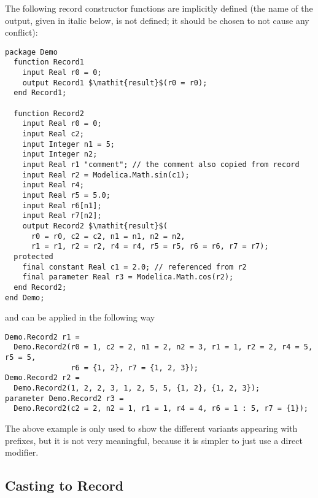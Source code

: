 \begin{nonnormative}
The following record constructor functions are implicitly defined (the name of the output, given in italic below, is not defined; it should be chosen to not cause any conflict):
\begin{lstlisting}[language=modelica,escapechar=!]
package Demo
  function Record1
    input Real r0 = 0;
    output Record1 $\mathit{result}$(r0 = r0);
  end Record1;

  function Record2
    input Real r0 = 0;
    input Real c2;
    input Integer n1 = 5;
    input Integer n2;
    input Real r1 "comment"; // the comment also copied from record
    input Real r2 = Modelica.Math.sin(c1);
    input Real r4;
    input Real r5 = 5.0;
    input Real r6[n1];
    input Real r7[n2];
    output Record2 $\mathit{result}$(
      r0 = r0, c2 = c2, n1 = n1, n2 = n2,
      r1 = r1, r2 = r2, r4 = r4, r5 = r5, r6 = r6, r7 = r7);
  protected
    final constant Real c1 = 2.0; // referenced from r2
    final parameter Real r3 = Modelica.Math.cos(r2);
  end Record2;
end Demo;
\end{lstlisting}
and can be applied in the following way
\begin{lstlisting}[language=modelica]
Demo.Record2 r1 =
  Demo.Record2(r0 = 1, c2 = 2, n1 = 2, n2 = 3, r1 = 1, r2 = 2, r4 = 5, r5 = 5,
               r6 = {1, 2}, r7 = {1, 2, 3});
Demo.Record2 r2 =
  Demo.Record2(1, 2, 2, 3, 1, 2, 5, 5, {1, 2}, {1, 2, 3});
parameter Demo.Record2 r3 =
  Demo.Record2(c2 = 2, n2 = 1, r1 = 1, r4 = 4, r6 = 1 : 5, r7 = {1});
\end{lstlisting}

The above example is only used to show the different variants appearing with prefixes, but it is not very meaningful, because it is simpler to just use a direct modifier.
\end{nonnormative}

\subsection{Casting to Record}\label{casting-to-record}

